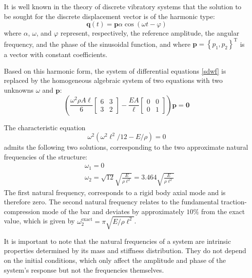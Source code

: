 \documentclass[12pt]{article}
\begin{document}
It is well known in the theory of discrete vibratory systems that the solution to be sought for the discrete displacement vector is of the harmonic type:
$$
    \mathbf{q}(t)=\mathbf{p} \alpha \cos (\omega t-\varphi)
$$
where $\alpha$, $\omega$, and $\varphi$ represent, respectively, the reference amplitude, the angular frequency, and the phase of the sinusoidal function, and where $\mathbf{p}=\left\{p_1, p_2\right\}^{\mathrm{T}}$ is a vector with constant coefficients.

Based on this harmonic form, the system of differential equations \eqref{sdwf} is replaced by the homogeneous algebraic system of two equations with two unknowns $\omega$ and $\mathbf p$:
$$
    \left(\frac{\omega^2 \rho A \ell}{6}\left[\begin{array}{ll}
            6 & 3 \\
            3 & 2
        \end{array}\right]-\frac{E A}{\ell}\left[\begin{array}{ll}
            0 & 0 \\
            0 & 1
        \end{array}\right]\right) \mathbf{p}=\mathbf{0}
$$

The characteristic equation
$$
    \omega^2\left(\omega^2 \ell^2 / 12-E / \rho\right)=0
$$
admits the following two solutions, corresponding to the two approximate natural frequencies of the structure:
$$
    \begin{aligned}
         & \omega_1=0                                                                           \\
         & \omega_2=\sqrt{12} \sqrt{\frac{E}{ \rho \ell^2}}=3.464 \sqrt{\frac{E}{ \rho \ell^2}}
    \end{aligned}
$$
The first natural frequency, corresponds to a rigid body axial mode and is therefore zero. The second natural frequency relates to the fundamental traction-compression mode of the bar and deviates by approximately $10 \%$ from the exact value, which is given by $\omega_2^{\text{exact}} =\pi \sqrt{E / \rho \ell^2}$.

It is important to note that the natural frequencies of a system are intrinsic properties determined by its mass and stiffness distribution. They do not depend on the initial conditions, which only affect the amplitude and phase of the system's response but not the frequencies themselves.
\end{document}

